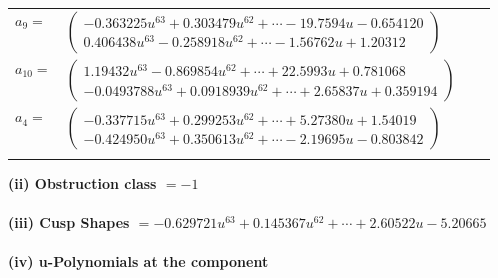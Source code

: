 \documentclass[1p]{elsarticle_modified}
\theoremstyle{definition}
\begin{document}
\begin{tabular}{m{7pt} m{180pt} m{7pt} m{180pt} }
\flushright $a_{9}=$&$\begin{pmatrix}-0.363225 u^{63}+0.303479 u^{62}+\cdots-19.7594 u-0.654120\\0.406438 u^{63}-0.258918 u^{62}+\cdots-1.56762 u+1.20312\end{pmatrix}$ \\
\flushright $a_{10}=$&$\begin{pmatrix}1.19432 u^{63}-0.869854 u^{62}+\cdots+22.5993 u+0.781068\\-0.0493788 u^{63}+0.0918939 u^{62}+\cdots+2.65837 u+0.359194\end{pmatrix}$ \\
\flushright $a_{4}=$&$\begin{pmatrix}-0.337715 u^{63}+0.299253 u^{62}+\cdots+5.27380 u+1.54019\\-0.424950 u^{63}+0.350613 u^{62}+\cdots-2.19695 u-0.803842\end{pmatrix}$\\&\end{tabular}
\flushleft \textbf{(ii) Obstruction class $= -1$}\\~\\
\flushleft \textbf{(iii) Cusp Shapes $= -0.629721 u^{63}+0.145367 u^{62}+\cdots+2.60522 u-5.20665$}\\~\\
\newpage\renewcommand{\arraystretch}{1}
\flushleft \textbf{(iv) u-Polynomials at the component}\newline \\
\end{document}
